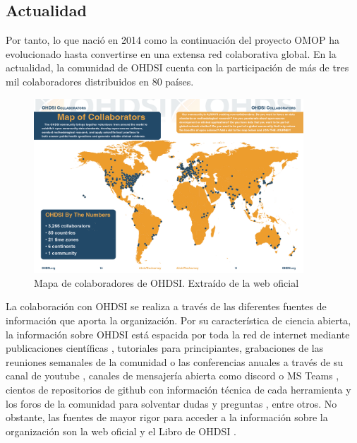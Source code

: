\subsection{Actualidad}

Por tanto, lo que nació en 2014 como la continuación del proyecto OMOP ha evolucionado hasta convertirse en una extensa red colaborativa global.  En la actualidad, la comunidad de OHDSI cuenta con la participación de más de tres mil colaboradores distribuidos en 80 países.

\begin{figure}[H]
    \centering
    \includegraphics[width=0.90\textwidth]{figures/OHDSIcollaborators.png}
     \caption{Mapa de colaboradores de OHDSI. Extraído de la web oficial \cite{OHDSIwebsite}}
    \label{fig:OHDSIcollaborators}
\end{figure}

La colaboración con OHDSI se realiza a través de las diferentes fuentes de información que aporta la organización. Por su característica de ciencia abierta, la información sobre OHDSI está espacida por toda la red de internet mediante publicaciones científicas \cite{OHDSIpublications}, tutoriales para principiantes, grabaciones de las reuniones semanales de la comunidad o las conferencias anuales a través de su canal de youtube \cite{OHDSIyt}, canales de mensajería abierta como discord \cite{OHDSIdiscordInvitation} o MS Teams \cite{OHDSIofficeForm}, cientos de repositorios de github con información técnica de cada herramienta \cite{OHDSIgithub} y los foros de la comunidad para solventar dudas y preguntas \cite{OHDSIforums}, entre otros. No obstante, las fuentes de mayor rigor para acceder a la información sobre la organización son la web oficial \cite{OHDSIwebsite} y el Libro de OHDSI \cite{OHDSIbook}.

